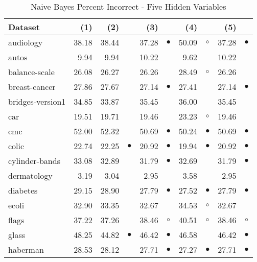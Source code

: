 \newpage
{\centering \footnotesize \begin{longtable}{lrr@{\hspace{0.1cm}}cr@{\hspace{0.1cm}}cr@{\hspace{0.1cm}}cr@{\hspace{0.1cm}}c}
\caption{\label{nbpi5}Naive Bayes Percent Incorrect - Five Hidden Variables}
\\
\hline
Dataset & (1)& (2) & & (3) & & (4) & & (5) & \\
\hline
audiology & 38.18 & 38.44 &           & 37.28 & $\bullet$ & 50.09 &    $\circ$ & 37.28 & $\bullet$\\
autos &  9.94 &  9.94 &           & 10.22 &           &  9.62 &            & 10.22 &          \\
balance-scale & 26.08 & 26.27 &           & 26.26 &           & 28.49 &    $\circ$ & 26.26 &          \\
breast-cancer & 27.86 & 27.67 &           & 27.14 & $\bullet$ & 27.41 &            & 27.14 & $\bullet$\\
bridges-version1 & 34.85 & 33.87 &           & 35.45 &           & 36.00 &            & 35.45 &          \\
car & 19.51 & 19.71 &           & 19.46 &           & 23.23 &    $\circ$ & 19.46 &          \\
cmc & 52.00 & 52.32 &           & 50.69 & $\bullet$ & 50.24 &  $\bullet$ & 50.69 & $\bullet$\\
colic & 22.74 & 22.25 & $\bullet$ & 20.92 & $\bullet$ & 19.94 &  $\bullet$ & 20.92 & $\bullet$\\
cylinder-bands & 33.08 & 32.89 &           & 31.79 & $\bullet$ & 32.69 &            & 31.79 & $\bullet$\\
dermatology &  3.19 &  3.04 &           &  2.95 &           &  3.58 &            &  2.95 &          \\
diabetes & 29.15 & 28.90 &           & 27.79 & $\bullet$ & 27.52 &  $\bullet$ & 27.79 & $\bullet$\\
ecoli & 32.90 & 33.35 &           & 32.67 &           & 34.53 &    $\circ$ & 32.67 &          \\
flags & 37.22 & 37.26 &           & 38.46 &   $\circ$ & 40.51 &    $\circ$ & 38.46 &   $\circ$\\
glass & 48.25 & 44.82 & $\bullet$ & 46.42 & $\bullet$ & 46.58 &            & 46.42 & $\bullet$\\
haberman & 28.53 & 28.12 &           & 27.71 & $\bullet$ & 27.27 &  $\bullet$ & 27.71 & $\bullet$\\

\end{longtable}}
